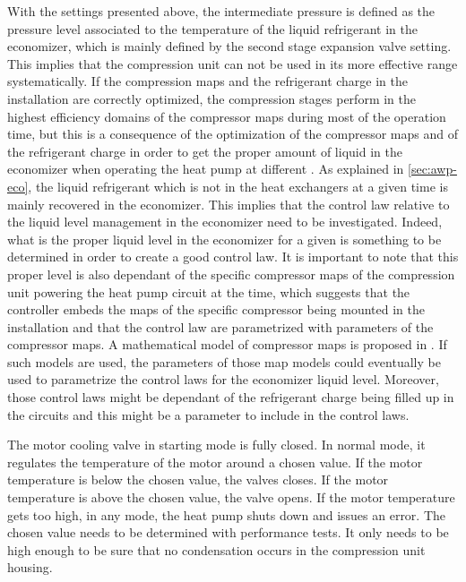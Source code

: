 With the settings presented above, the intermediate pressure is
defined as the pressure level associated to the temperature of the
liquid refrigerant in the economizer, which is mainly defined by the
second stage expansion valve setting. This implies that the
compression unit can not be used in its more effective range
systematically. If the compression maps and the refrigerant charge in
the installation are correctly optimized, the compression stages
perform in the highest efficiency domains of the compressor maps
during most of the operation time, but this is a consequence of the
optimization of the compressor maps and of the refrigerant charge in
order to get the proper amount of liquid in the economizer when
operating the heat pump at different \OP{}. As explained in
\cref{sec:awp-eco}, the liquid refrigerant which is not in the heat
exchangers at a given time is mainly recovered in the economizer. This
implies that the control law relative to the liquid level management
in the economizer need to be investigated. Indeed, what is the proper
liquid level in the economizer for a given \OP{} is something to be
determined in order to create a good control law. It is important to
note that this proper level is also dependant of the specific
compressor maps of the compression unit powering the heat pump circuit
at the time, which suggests that the controller embeds the maps of the
specific compressor being mounted in the installation and that the
control law are parametrized with parameters of the compressor maps. A
mathematical model of compressor maps is proposed in
. If such models are used, the parameters
of those map models could eventually be used to parametrize the
control laws for the economizer liquid level. Moreover, those control
laws might be dependant of the refrigerant charge being filled up in
the circuits and this might be a parameter to include in the control
laws.

The motor cooling valve in starting mode is fully
closed. In normal mode, it regulates the temperature of
the motor around a chosen value. If the motor temperature is below
the chosen value, the valves closes. If the motor temperature is above
the chosen value, the valve opens. If the motor temperature gets too
high, in any mode, the heat pump shuts down and issues
an error. The chosen value needs to be determined with performance
tests. It only needs to be high enough to be sure that no condensation
occurs in the compression unit housing.

